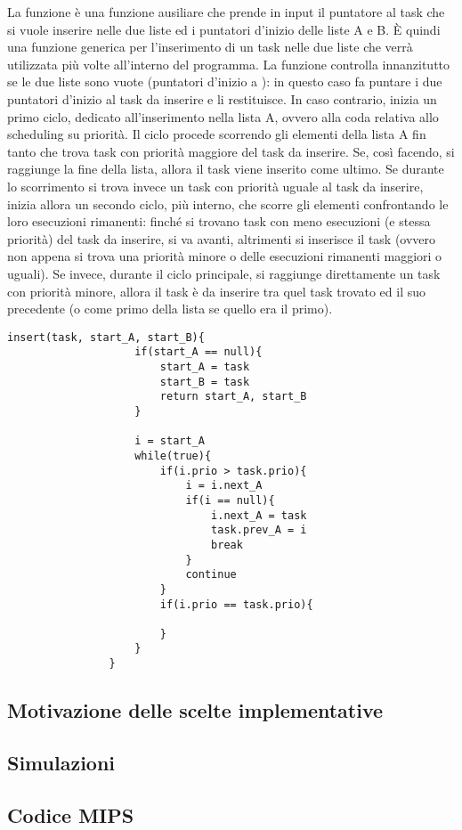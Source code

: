         La funzione  è una funzione ausiliare che prende in input il puntatore al task che si vuole inserire nelle due liste ed i puntatori d'inizio delle liste A e B. È quindi una funzione generica per l'inserimento di un task nelle due liste che verrà utilizzata più volte all'interno del programma. La funzione controlla innanzitutto se le due liste sono vuote (puntatori d'inizio a ): in questo caso fa puntare i due puntatori d'inizio al task da inserire e li restituisce. In caso contrario, inizia un primo ciclo, dedicato all'inserimento nella lista A, ovvero alla coda relativa allo scheduling su priorità. Il ciclo procede scorrendo gli elementi della lista A fin tanto che trova task con priorità maggiore del task da inserire. Se, così facendo, si raggiunge la fine della lista, allora il task viene inserito come ultimo. Se durante lo scorrimento si trova invece un task con priorità uguale al task da inserire, inizia allora un secondo ciclo, più interno, che scorre gli elementi confrontando le loro esecuzioni rimanenti: finché si trovano task con meno esecuzioni (e stessa priorità) del task da inserire, si va avanti, altrimenti si inserisce il task (ovvero non appena si trova una priorità minore o delle esecuzioni rimanenti maggiori o uguali). Se invece, durante il ciclo principale, si raggiunge direttamente un task con priorità minore, allora il task è da inserire tra quel task trovato ed il suo precedente (o come primo della lista se quello era il primo). 
        
        \begin{center}
           	\begin{lstlisting}[language=pseudo, gobble=14]
                insert(task, start_A, start_B){
                    if(start_A == null){
                        start_A = task
                        start_B = task
                        return start_A, start_B
                    }
                    
                    i = start_A
                    while(true){
                        if(i.prio > task.prio){
                            i = i.next_A
                            if(i == null){
                                i.next_A = task
                                task.prev_A = i
                                break
                            }
                            continue
                        }
                        if(i.prio == task.prio){
                            
                        }
                    }
                }\end{lstlisting}
        \end{center}
    
    \subsection*{Motivazione delle scelte implementative}
    
    \subsection*{Simulazioni}
    
    \subsection*{Codice MIPS}
